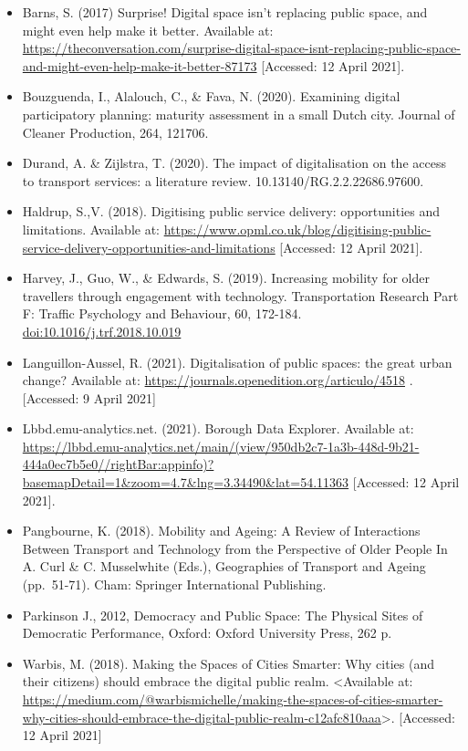 \documentclass[
]{book}
\providecommand{\tightlist}{%
  \setlength{\itemsep}{0pt}\setlength{\parskip}{0pt}}
\begin{document}
\begin{itemize}
\tightlist
\item
  Barns, S. (2017) Surprise! Digital space isn't replacing public space, and might even help make it better. Available at: \url{https://theconversation.com/surprise-digital-space-isnt-replacing-public-space-and-might-even-help-make-it-better-87173} {[}Accessed: 12 April 2021{]}.
\item
  Bouzguenda, I., Alalouch, C., \& Fava, N. (2020). Examining digital participatory planning: maturity assessment in a small Dutch city. Journal of Cleaner Production, 264, 121706.
\item
  Durand, A. \& Zijlstra, T. (2020). The impact of digitalisation on the access to transport services: a literature review. 10.13140/RG.2.2.22686.97600.
\item
  Haldrup, S.,V. (2018). Digitising public service delivery: opportunities and limitations. Available at: \url{https://www.opml.co.uk/blog/digitising-public-service-delivery-opportunities-and-limitations} {[}Accessed: 12 April 2021{]}.
\item
  Harvey, J., Guo, W., \& Edwards, S. (2019). Increasing mobility for older travellers through engagement with technology. Transportation Research Part F: Traffic Psychology and Behaviour, 60, 172-184. \url{doi:10.1016/j.trf.2018.10.019}
\item
  Languillon-Aussel, R. (2021). Digitalisation of public spaces: the great urban change? Available at: \url{https://journals.openedition.org/articulo/4518} . {[}Accessed: 9 April 2021{]}
\item
  Lbbd.emu-analytics.net. (2021). Borough Data Explorer. Available at: \url{https://lbbd.emu-analytics.net/main/(view/950db2c7-1a3b-448d-9b21-444a0ec7b5e0//rightBar:appinfo)?basemapDetail=1\&zoom=4.7\&lng=3.34490\&lat=54.11363} {[}Accessed: 12 April 2021{]}.
\item
  Pangbourne, K. (2018). Mobility and Ageing: A Review of Interactions Between Transport and Technology from the Perspective of Older People In A. Curl \& C. Musselwhite (Eds.), Geographies of Transport and Ageing (pp.~51-71). Cham: Springer International Publishing.
\item
  Parkinson J., 2012, Democracy and Public Space: The Physical Sites of Democratic Performance, Oxford: Oxford University Press, 262 p.
\item
  Warbis, M. (2018). Making the Spaces of Cities Smarter: Why cities (and their citizens) should embrace the digital public realm. \textless Available at: \url{https://medium.com/@warbismichelle/making-the-spaces-of-cities-smarter-why-cities-should-embrace-the-digital-public-realm-c12afc810aaa}\textgreater. {[}Accessed: 12 April 2021{]}
\end{itemize}
\end{document}

